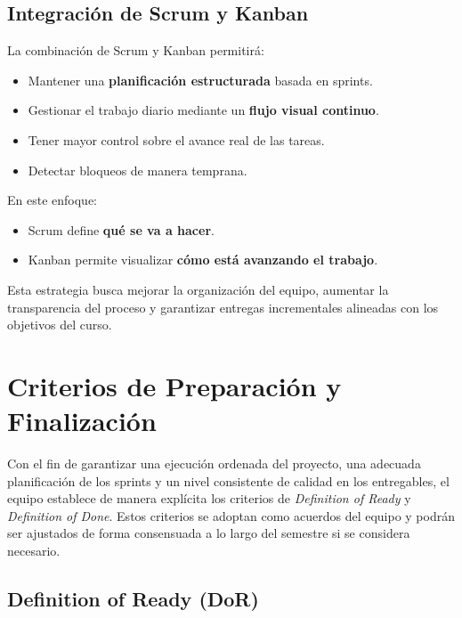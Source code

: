 \documentclass[12pt]{article}
\begin{document}
\subsection{Integración de Scrum y Kanban}

La combinación de Scrum y Kanban permitirá:

\begin{itemize}
    \item Mantener una \textbf{planificación estructurada} basada en sprints.
    \item Gestionar el trabajo diario mediante un \textbf{flujo visual continuo}.
    \item Tener mayor control sobre el avance real de las tareas.
    \item Detectar bloqueos de manera temprana.
\end{itemize}

En este enfoque:

\begin{itemize}
    \item Scrum define \textbf{qué se va a hacer}.
    \item Kanban permite visualizar \textbf{cómo está avanzando el trabajo}.
\end{itemize}

Esta estrategia busca mejorar la organización del equipo, aumentar la transparencia del proceso y garantizar entregas incrementales alineadas con los objetivos del curso.

\section{Criterios de Preparación y Finalización}

Con el fin de garantizar una ejecución ordenada del proyecto, una adecuada planificación de los sprints y un nivel consistente de calidad en los entregables, el equipo establece de manera explícita los criterios de \textit{Definition of Ready} y \textit{Definition of Done}. Estos criterios se adoptan como acuerdos del equipo y podrán ser ajustados de forma consensuada a lo largo del semestre si se considera necesario.

\subsection{Definition of Ready (DoR)}
\end{document}
